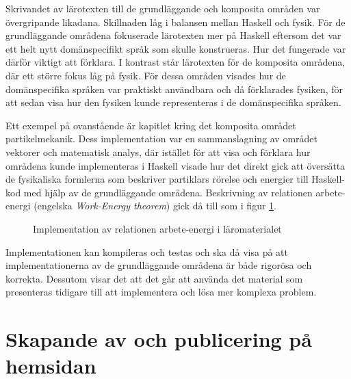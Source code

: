 Skrivandet av lärotexten till de grundläggande och komposita områden var
övergripande likadana. Skillnaden låg i balansen mellan Haskell och fysik. För
de grundläggande områdena fokuserade lärotexten mer på Haskell eftersom det var
ett helt nytt domänspecifikt språk som skulle konstrueras. Hur det fungerade var
därför viktigt att förklara. I kontrast står lärotexten för de komposita
områdena, där ett större fokus låg på fysik. För dessa områden visades hur de
domänspecifika språken var praktiskt användbara och då förklarades fysiken, för
att sedan visa hur den fysiken kunde representeras i de domänspecifika
språken.

Ett exempel på ovanstående är kapitlet kring det komposita området partikelmekanik. Dess implementation var en sammanslagning av området vektorer och
matematisk analys, där istället för att visa och förklara hur områdena kunde
implementeras i Haskell visade hur det direkt gick att översätta de
fysikaliska formlerna som beskriver partiklars rörelse och energier till
Haskell-kod med hjälp av de grundläggande områdena. Beskrivning av relationen arbete-energi (engelska \textit{Work-Energy theorem}) gick då till som i figur \ref{fig:komposit-ex}.

\begin{figure}[tph]
  \centering
  \caption{Implementation av relationen arbete-energi i läromaterialet}
  \label{fig:komposit-ex}
\end{figure}

Implementationen kan kompileras och testas och ska då visa på att
implementationerna av de grundläggande områdena är både rigorösa och korrekta.
Dessutom visar det att det går att använda det material som presenteras tidigare
till  att implementera och lösa mer komplexa problem.

\section{Skapande av och publicering på hemsidan}

